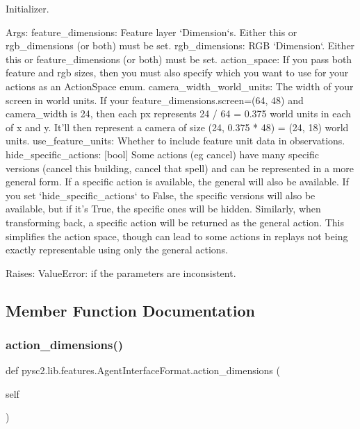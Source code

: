\begin{DoxyVerb}Initializer.

Args:
  feature_dimensions: Feature layer `Dimension`s. Either this or
  rgb_dimensions (or both) must be set.
  rgb_dimensions: RGB `Dimension`. Either this or feature_dimensions
  (or both) must be set.
  action_space: If you pass both feature and rgb sizes, then you must also
  specify which you want to use for your actions as an ActionSpace enum.
  camera_width_world_units: The width of your screen in world units. If your
  feature_dimensions.screen=(64, 48) and camera_width is 24, then each
  px represents 24 / 64 = 0.375 world units in each of x and y.
  It'll then represent a camera of size (24, 0.375 * 48) = (24, 18)
  world units.
  use_feature_units: Whether to include feature unit data in observations.
  hide_specific_actions: [bool] Some actions (eg cancel) have many
  specific versions (cancel this building, cancel that spell) and can
  be represented in a more general form. If a specific action is
  available, the general will also be available. If you set
  `hide_specific_actions` to False, the specific versions will also be
  available, but if it's True, the specific ones will be hidden.
  Similarly, when transforming back, a specific action will be returned
  as the general action. This simplifies the action space, though can
  lead to some actions in replays not being exactly representable using
  only the general actions.

Raises:
  ValueError: if the parameters are inconsistent.
\end{DoxyVerb}
 

\subsection{Member Function Documentation}
\mbox{\label{classpysc2_1_1lib_1_1features_1_1_agent_interface_format_a8fa5a036defb7844b94946a505e28148}} 
\subsubsection{\texorpdfstring{action\+\_\+dimensions()}{action\_dimensions()}}
{\footnotesize\ttfamily def pysc2.\+lib.\+features.\+Agent\+Interface\+Format.\+action\+\_\+dimensions (\begin{DoxyParamCaption}\item[{}]{self }\end{DoxyParamCaption})}


